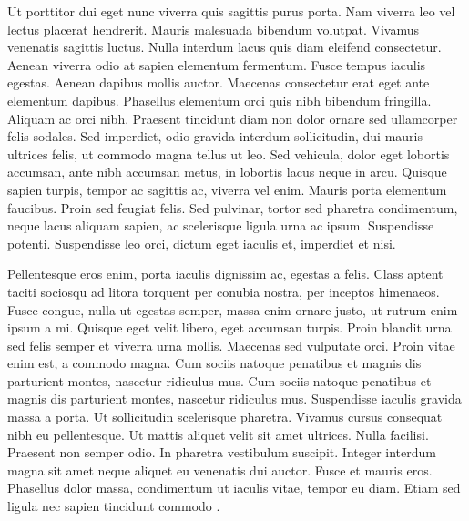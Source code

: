 \begin{refsection}
Ut porttitor dui eget nunc viverra quis sagittis purus porta. Nam
viverra leo vel lectus placerat hendrerit. Mauris malesuada bibendum
volutpat. Vivamus venenatis sagittis luctus. Nulla interdum lacus quis
diam eleifend consectetur. Aenean viverra odio at sapien elementum
fermentum. Fusce tempus iaculis egestas. Aenean dapibus mollis
auctor. Maecenas consectetur erat eget ante elementum
dapibus. Phasellus elementum orci quis nibh bibendum
fringilla. Aliquam ac orci nibh. Praesent tincidunt diam non dolor
ornare sed ullamcorper felis sodales. Sed imperdiet, odio gravida
interdum sollicitudin, dui mauris ultrices felis, ut commodo magna
tellus ut leo. Sed vehicula, dolor eget lobortis accumsan, ante nibh
accumsan metus, in lobortis lacus neque in arcu. Quisque sapien
turpis, tempor ac sagittis ac, viverra vel enim. Mauris porta
elementum faucibus. Proin sed feugiat felis. Sed pulvinar, tortor sed
pharetra condimentum, neque lacus aliquam sapien, ac scelerisque
ligula urna ac ipsum. Suspendisse potenti. Suspendisse leo orci,
dictum eget iaculis et, imperdiet et nisi.

Pellentesque eros enim, porta iaculis dignissim ac, egestas a
felis. Class aptent taciti sociosqu ad litora torquent per conubia
nostra, per inceptos himenaeos. Fusce congue, nulla ut egestas semper,
massa enim ornare justo, ut rutrum enim ipsum a mi. Quisque eget velit
libero, eget accumsan turpis. Proin blandit urna sed felis semper et
viverra urna mollis. Maecenas sed vulputate orci. Proin vitae enim
est, a commodo magna. Cum sociis natoque penatibus et magnis dis
parturient montes, nascetur ridiculus mus. Cum sociis natoque
penatibus et magnis dis parturient montes, nascetur ridiculus
mus. Suspendisse iaculis gravida massa a porta. Ut sollicitudin
scelerisque pharetra. Vivamus cursus consequat nibh eu
pellentesque. Ut mattis aliquet velit sit amet ultrices. Nulla
facilisi. Praesent non semper odio. In pharetra vestibulum
suscipit. Integer interdum magna sit amet neque aliquet eu venenatis
dui auctor. Fusce et mauris eros. Phasellus dolor massa, condimentum
ut iaculis vitae, tempor eu diam. Etiam sed ligula nec sapien
tincidunt commodo \cite{test}.


\end{refsection}
